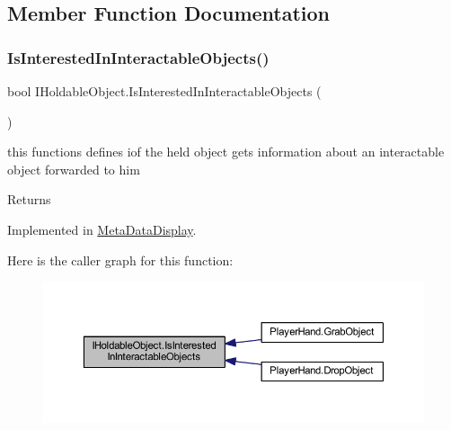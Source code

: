 \subsection{Member Function Documentation}
\mbox{\label{interface_i_holdable_object_a0356d534c17ab4e04fba00b42abeea77}} 
\subsubsection{\texorpdfstring{Is\+Interested\+In\+Interactable\+Objects()}{IsInterestedInInteractableObjects()}}
{\footnotesize\ttfamily bool I\+Holdable\+Object.\+Is\+Interested\+In\+Interactable\+Objects (\begin{DoxyParamCaption}{ }\end{DoxyParamCaption})}



this functions defines iof the held object gets information about an interactable object forwarded to him 

\begin{DoxyReturn}{Returns}

\end{DoxyReturn}


Implemented in \mbox{\hyperlink{class_meta_data_display_a6aa943864ef85667977a13c895c2ce23}{Meta\+Data\+Display}}.

Here is the caller graph for this function\+:\nopagebreak
\begin{figure}[H]
\begin{center}
\leavevmode
\includegraphics[width=350pt]{interface_i_holdable_object_a0356d534c17ab4e04fba00b42abeea77_icgraph}
\end{center}
\end{figure}
\mbox{\label{interface_i_holdable_object_a19523673c41505d8533aa50b957e95a1}} 
